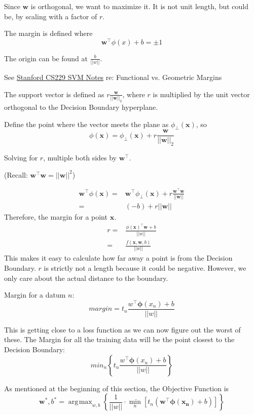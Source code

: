 \documentclass[11pt, oneside]{article}   	%
\DeclareMathOperator*{\argmax}{\arg\!\max}
\begin{document}
Since $\mathbf{w}$ is orthogonal, we want to maximize it. It is not unit length, but could be, by scaling with a factor of $r$.

The margin is defined where
\[
\mathbf{w}^\intercal\phi(x)+b = \pm 1
\]

The origin can be found at $\frac{b}{||w||}$.

See \href{http://cs229.stanford.edu/notes/cs229-notes3.pdf}{Stanford CS229 SVM Notes} re: Functional vs. Geometric Margins

The support vector is defined as $r\frac{\mathbf{w}}{||\mathbf{w}||_2}$, where $r$ is multiplied by the unit vector orthogonal to the Decision Boundary hyperplane. 

Define the point where the vector meets the plane as $\phi_\perp (\mathbf{x})$, so
\begin{equation}
\phi(\mathbf{x}) = \phi_\perp(\mathbf{x}) + r\frac{\mathbf{w}}{||\mathbf{w}||_2}
\end{equation}

Solving for $r$, multiple both sides by $\mathbf{w}^\intercal$.

(Recall: $\mathbf{w}^\intercal\mathbf{w} = ||\mathbf{w}||^2$)

\begin{align}
\mathbf{w}^\intercal\phi(\mathbf{x}) = &\mathbf{w}^\intercal  \phi_\perp(\mathbf{x})  +	 r\frac{\mathbf{w}^\intercal\mathbf{w}}{||\mathbf{w}||} \\
			 = & (-b) + r||\mathbf{w}||
\end{align}
Therefore, the margin for a point $\mathbf{x}$.
\begin{align}
r = &\frac{\phi(\mathbf{x})^\intercal\mathbf{w}+b}{||w||} \\
  = & \frac{f(\mathbf{x},\mathbf{w},b)}{||w||}
\end{align}
This makes it easy to calculate how far away a point is from the Decision Boundary. $r$ is strictly not a length because it could be negative. However, we only care about the actual distance to the boundary.

Margin for a datum $n$:
\[
margin = t_n\frac{w^\intercal\boldsymbol{\phi}(x_n)+b}{||w||}
\]

This is getting close to a loss function as we can now figure out the worst of these. The Margin for all the training data will be the point closest to the Decision Boundary:
\[
min_n\left\{   t_n\frac{w^\intercal\boldsymbol{\phi}(x_n)+b}{||w||} \right\}
\]

As mentioned at the beginning of this section, the Objective Function is 
\[
\mathbf{w}^*,b^*=
\argmax_{w,b} \left\{\frac{1}{||w||} \cdot \min_n \left[t_n (\mathbf{w}^\intercal \boldsymbol{\phi}(\mathbf{x_n})+b)\right] \right\}
\]
\end{document}
